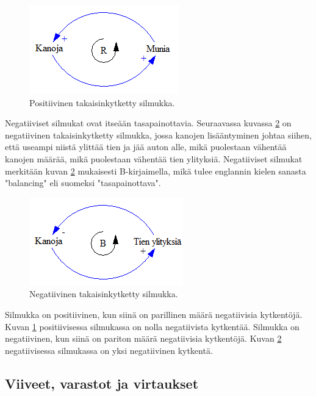 \documentclass[finnish,12pt,a4paper,pdftex]{article}
\begin{document}
\begin{onehalfspacing}
\begin{figure}[H]
\centering \includegraphics{positiivinen}
\caption{Positiivinen takaisinkytketty silmukka. \cite[s. 13]{Sterman2000} \label{sysdyn:positiivinen}}
\end{figure}

Negatiiviset silmukat ovat itseään tasapainottavia. Seuraavassa kuvassa \ref{sysdyn:negatiivinen} on negatiivinen takaisinkytketty silmukka, jossa kanojen lisääntyminen johtaa siihen, että useampi niistä ylittää tien ja jää auton alle, mikä puolestaan vähentää kanojen määrää, mikä puolestaan vähentää tien ylityksiä. Negatiiviset silmukat merkitään kuvan \ref{sysdyn:negatiivinen} mukaisesti B-kirjaimella, mikä tulee englannin kielen sanasta "balancing" eli suomeksi "tasapainottava". \cite[s. 12--14]{Sterman2000}

\begin{figure}[H]
\centering \includegraphics{negatiivinen}
\caption{Negatiivinen takaisinkytketty silmukka. \cite[s. 13]{Sterman2000} \label{sysdyn:negatiivinen}}
\end{figure}

Silmukka on positiivinen, kun siinä on parillinen määrä negatiivisia kytkentöjä. Kuvan \ref{sysdyn:positiivinen} positiivisessa silmukassa on nolla negatiivista kytkentää. Silmukka on negatiivinen, kun siinä on pariton määrä negatiivisia kytkentöjä. Kuvan \ref{sysdyn:negatiivinen} negatiivisessa silmukassa on yksi negatiivinen kytkentä. \cite[s. 12--14]{Sterman2000}

\clearpage
\subsection{Viiveet, varastot ja virtaukset \label{sysdyn:vvv}}


\end{onehalfspacing}
\end{document}

